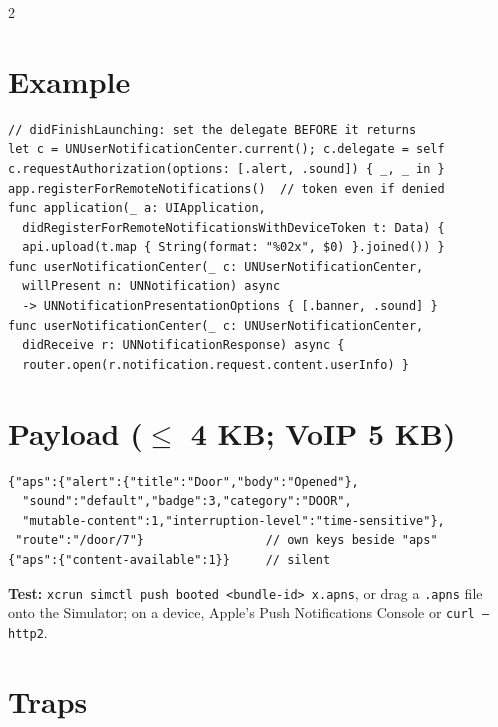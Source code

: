 \documentclass[8pt]{extarticle}
\begin{document}
\begin{multicols}{2}
\section{Example}
\begin{lstlisting}[language=SwiftSheet]
// didFinishLaunching: set the delegate BEFORE it returns
let c = UNUserNotificationCenter.current(); c.delegate = self
c.requestAuthorization(options: [.alert, .sound]) { _, _ in }
app.registerForRemoteNotifications()  // token even if denied
func application(_ a: UIApplication,
  didRegisterForRemoteNotificationsWithDeviceToken t: Data) {
  api.upload(t.map { String(format: "%02x", $0) }.joined()) }
func userNotificationCenter(_ c: UNUserNotificationCenter,
  willPresent n: UNNotification) async
  -> UNNotificationPresentationOptions { [.banner, .sound] }
func userNotificationCenter(_ c: UNUserNotificationCenter,
  didReceive r: UNNotificationResponse) async {
  router.open(r.notification.request.content.userInfo) }
\end{lstlisting}

\columnbreak

\section{Payload (\(\le\) 4 KB; VoIP 5 KB)}
\begin{lstlisting}
{"aps":{"alert":{"title":"Door","body":"Opened"},
  "sound":"default","badge":3,"category":"DOOR",
  "mutable-content":1,"interruption-level":"time-sensitive"},
 "route":"/door/7"}                 // own keys beside "aps"
{"aps":{"content-available":1}}     // silent
\end{lstlisting}
\textbf{Test:} \texttt{xcrun simctl push booted <bundle-id> x.apns}, or drag a
\texttt{.apns} file onto the Simulator; on a device, Apple's Push Notifications
Console or \texttt{curl~--http2}.

\section{Traps}
\begin{itemize}
\end{itemize}


\end{multicols}
\end{document}
